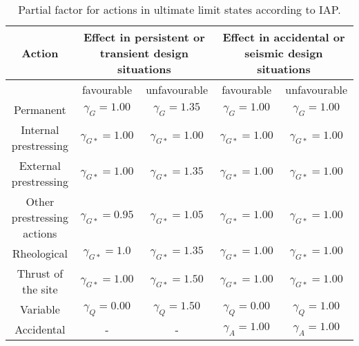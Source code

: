 \begin{table}
\begin{center}
\begin{footnotesize}
\begin{tabular}{|c|c|c|c|c|}
\hline
Action & \multicolumn{2}{|p{4cm}|}{Effect in persistent or transient design situations} &\multicolumn{2}{|p{4cm}|}{Effect in accidental or seismic design situations} \\
\hline
 & favourable & unfavourable & favourable & unfavourable \\
\hline
Permanent  & $\gamma_G= 1.00$ &  $\gamma_G= 1.35$ & $\gamma_G= 1.00$ &  $\gamma_G= 1.00$ \\
\hline
Internal prestressing & $\gamma_{G*}= 1.00$ &  $\gamma_{G*}= 1.00$ & $\gamma_{G*}= 1.00$ &  $\gamma_{G*}= 1.00$ \\
\hline
External prestressing & $\gamma_{G*}= 1.00$ &  $\gamma_{G*}= 1.35$ & $\gamma_{G*}= 1.00$ &  $\gamma_{G*}= 1.00$ \\
\hline
Other prestressing actions & $\gamma_{G*}= 0.95$ &  $\gamma_{G*}= 1.05$ & $\gamma_{G*}= 1.00$ &  $\gamma_{G*}= 1.00$ \\
\hline
Rheological & $\gamma_{G*}= 1.0$ &  $\gamma_{G*}= 1.35$ & $\gamma_{G*}= 1.00$ &  $\gamma_{G*}= 1.00$ \\
\hline
Thrust of the site & $\gamma_{G*}= 1.00$ &  $\gamma_{G*}= 1.50$ & $\gamma_{G*}= 1.00$ &  $\gamma_{G*}= 1.00$ \\
\hline
Variable & $\gamma_Q= 0.00$ &  $\gamma_Q= 1.50$ & $\gamma_Q= 0.00$ &  $\gamma_Q= 1.00$ \\
\hline
Accidental & - & - &  $\gamma_A= 1.00$ &  $\gamma_A= 1.00$ \\
\hline
\end{tabular}
\end{footnotesize}
\caption{Partial factor for actions in ultimate limit states according to IAP.} \label{tb_gf_ELU_IAP}
\end{center}
\end{table}
